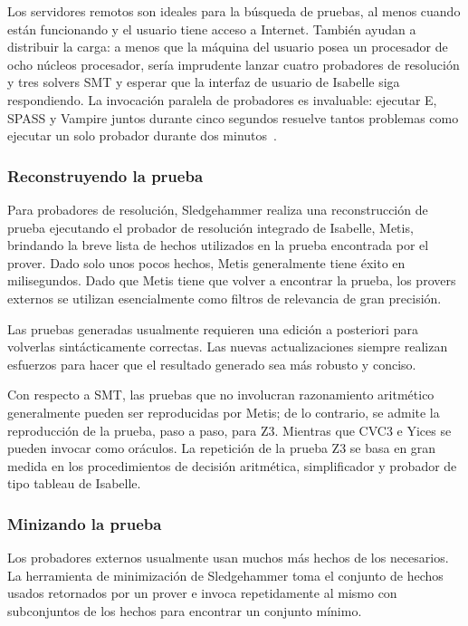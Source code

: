 \documentclass[12pt]{book}
\begin{document}
Los servidores remotos son ideales para la búsqueda de pruebas, al menos cuando están funcionando y el usuario tiene acceso a Internet. También ayudan a distribuir la carga: a menos que la máquina del usuario posea un procesador de ocho núcleos procesador, sería imprudente lanzar cuatro probadores de resolución y tres solvers SMT y esperar que la interfaz de usuario de Isabelle siga respondiendo. La invocación paralela de probadores es invaluable: ejecutar E, SPASS y Vampire juntos durante cinco segundos resuelve tantos problemas como ejecutar un solo probador durante dos minutos~\cite{sledgehammer_judgement_day}.

\subsubsection{Reconstruyendo la prueba}

Para probadores de resolución, Sledgehammer realiza una reconstrucción de prueba ejecutando el probador de resolución integrado de Isabelle, Metis, brindando la breve lista de hechos utilizados en la prueba encontrada por el prover. Dado solo unos pocos hechos, Metis generalmente tiene éxito en milisegundos. Dado que Metis tiene que volver a encontrar la prueba, los provers externos se utilizan esencialmente como filtros de relevancia de gran precisión.

Las pruebas generadas usualmente requieren una edición a posteriori para volverlas sintácticamente correctas. Las nuevas actualizaciones siempre realizan esfuerzos para hacer que el resultado generado sea más robusto y conciso.

Con respecto a SMT, las pruebas que no involucran razonamiento aritmético generalmente pueden ser reproducidas por Metis; de lo contrario, se admite la reproducción de la prueba, paso a paso, para Z3. Mientras que CVC3 e Yices se pueden invocar como oráculos. La repetición de la prueba Z3 se basa en gran medida en los procedimientos de decisión aritmética, simplificador y probador de tipo tableau de Isabelle.

\subsubsection{Minizando la prueba}

Los probadores externos usualmente usan muchos más hechos de los necesarios. La herramienta de minimización de Sledgehammer toma el conjunto de hechos usados retornados por un prover e invoca repetidamente al mismo con subconjuntos de los hechos para encontrar un conjunto mínimo.
\end{document}
